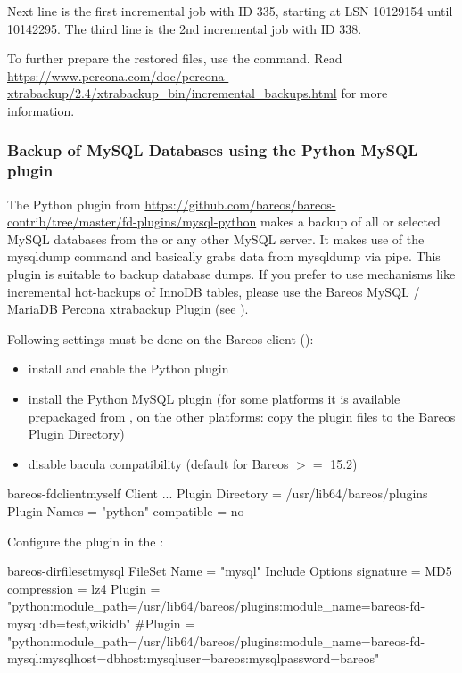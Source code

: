 Next line is the first incremental job with ID 335, starting at LSN 10129154 until 10142295. The third line is the 2nd incremental job with ID 338.

To further prepare the restored files, use the  command. 
Read \url{https://www.percona.com/doc/percona-xtrabackup/2.4/xtrabackup_bin/incremental_backups.html} for more information.


\subsubsection{Backup of MySQL Databases using the Python MySQL plugin}
\label{backup-mysql-python}

The Python plugin from \url{https://github.com/bareos/bareos-contrib/tree/master/fd-plugins/mysql-python} makes a backup of all or selected 
MySQL databases from the \bareosFd or any other MySQL server. It makes use of the mysqldump command and basically grabs data from mysqldump via pipe.
This plugin is suitable to backup database dumps. 
If you prefer to use mechanisms like incremental hot-backups of InnoDB tables, please use the Bareos MySQL / MariaDB Percona xtrabackup Plugin (see ).

Following settings must be done on the Bareos client (\bareosFd):
\begin{itemize}
  \item install and enable the \bareosFd Python plugin
  \item install the Python MySQL plugin (for some platforms it is available prepackaged from \contribDownloadBareosOrg, on the other platforms: copy the plugin files to the Bareos Plugin Directory)
  \item disable bacula compatibility (default for Bareos $>=$ 15.2)
\end{itemize}

\begin{bareosConfigResource}{bareos-fd}{client}{myself}
Client {
  ...
  Plugin Directory = /usr/lib64/bareos/plugins
  Plugin Names = "python"
  compatible = no
}
\end{bareosConfigResource}

Configure the plugin in the \bareosDir:

\begin{bareosConfigResource}{bareos-dir}{fileset}{mysql}
FileSet {
    Name = "mysql"
    Include {
      Options {
        signature = MD5
        compression = lz4
      }
      Plugin = "python:module_path=/usr/lib64/bareos/plugins:module_name=bareos-fd-mysql:db=test,wikidb"
      #Plugin = "python:module_path=/usr/lib64/bareos/plugins:module_name=bareos-fd-mysql:mysqlhost=dbhost:mysqluser=bareos:mysqlpassword=bareos"
    }
}
\end{bareosConfigResource}

